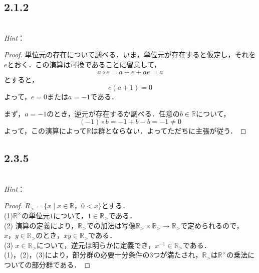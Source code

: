 \documentclass[dvipdfmx,uplatex,11pt]{jsarticle}
\begin{document}
\newpage

\subsection{2.1.2}
\noindent
\\
\textsl{Hint}：\\
\dotfill

\begin{leftbar}
\begin{proof}
\noindent
単位元の存在について調べる．いま，単位元が存在すると仮定し，それを$e$とおく．この演算は可換であることに留意して，
\[
a \circ e =  a + e +ae =a
\]
とすると，
\[
e (a+1)=0
\]
よって，$e=0$または$a=-1$である．\par
まず，$a=-1$のとき，逆元が存在するか調べる．任意の$b \in \mathbb{R}$について，
\[
(-1) \circ b = -1 +b -b =-1 \ne 0
\]
よって，この演算によって$\mathbb{R}$は群とならない．よってただちに主張が従う．
\end{proof}
\end{leftbar}

\newpage

\subsection{2.3.5}
\noindent
\\
\textsl{Hint}：\\
\dotfill
\begin{leftbar}
    \begin{proof}
        $R_{>} =\{x \mid x \in \mathbb{R}，0<x\}$とする．\\
        (1)\quad $\mathbb{R}^{\times}$の単位元$1$について，$1 \in \mathbb{R}_{>}$である．\\
        (2) \quad 演算の定義により，$\mathbb{R}_{>}$での加法は写像$\mathbb{R}_{>} \times \mathbb{R}_{>} \to \mathbb{R}_{>}$で定められるので，
        $x，y \in \mathbb{R}_{>}$のとき，$xy \in \mathbb{R}_{>}$である．\\
        (3) \quad $x \in \mathbb{R}_{>}$について，逆元は明らかに定義でき，$x^{-1} \in \mathbb{R}_{>}$である．\\
        (1)，(2)，(3)により，部分群の必要十分条件の3つが満たされ，$\mathbb{R}_{>}$は$\mathbb{R}^{\times}$の乗法についての部分群である．
    \end{proof}
\end{leftbar}
\end{document}
